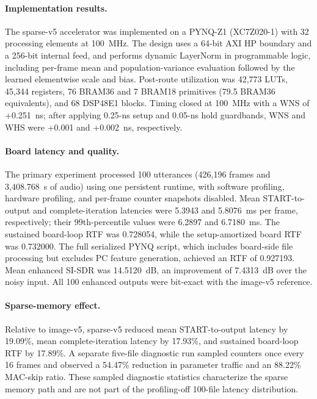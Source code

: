 
\paragraph{Implementation results.}
The sparse-v5 accelerator was implemented on a PYNQ-Z1 (XC7Z020-1) with 32
processing elements at 100~MHz.  The design uses a 64-bit AXI HP boundary and
a 256-bit internal feed, and performs dynamic LayerNorm in programmable logic,
including per-frame mean and population-variance evaluation followed by the
learned elementwise scale and bias.  Post-route utilization was 42,773 LUTs,
45,344 registers, 76 BRAM36 and 7 BRAM18 primitives (79.5 BRAM36 equivalents),
and 68 DSP48E1 blocks.  Timing closed at 100~MHz with a WNS of +0.251~ns; after
applying 0.25-ns setup and 0.05-ns hold guardbands, WNS and WHS were +0.001 and
+0.002~ns, respectively.

\paragraph{Board latency and quality.}
The primary experiment processed 100 utterances (426,196 frames and
3,408.768~s of audio) using one persistent runtime, with software profiling,
hardware profiling, and per-frame counter snapshots disabled.  Mean
START-to-output and complete-iteration latencies were 5.3943 and 5.8076~ms per
frame, respectively; their 99th-percentile values were 6.2897 and 6.7180~ms.
The sustained board-loop RTF was 0.728054, while the setup-amortized board RTF
was 0.732000.  The full serialized PYNQ script, which includes board-side file
processing but excludes PC feature generation, achieved an RTF of 0.927193.
Mean enhanced SI-SDR was 14.5120~dB, an improvement of 7.4313~dB over the noisy
input.  All 100 enhanced outputs were bit-exact with the image-v5 reference.

\paragraph{Sparse-memory effect.}
Relative to image-v5, sparse-v5 reduced mean START-to-output latency by 19.09\%,
mean complete-iteration latency by 17.93\%, and sustained board-loop RTF by
17.89\%.  A separate five-file diagnostic run sampled counters once every 16
frames and observed a 54.47\% reduction in parameter traffic and an 88.22\%
MAC-skip ratio.  These sampled diagnostic statistics characterize the sparse
memory path and are not part of the profiling-off 100-file latency
distribution.

